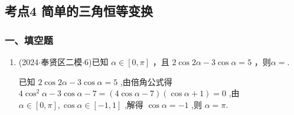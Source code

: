 \subsection*{考点4 简单的三角恒等变换}

\subsubsection*{一、填空题}
\begin{enumerate}
    \item (2024$\cdot$奉贤区二模$\cdot$6)已知 $\alpha  \in  \left\lbrack  {0,\pi }\right\rbrack$ ，且 ${2\cos {2\alpha } - 3\cos \alpha } = 5$ ，则$\alpha = $\blkda[2]{$\pi$}.
    \begin{jieda}
        已知 $2\cos {2\alpha } - 3\cos \alpha  = 5$ ,由倍角公式得 $4{\cos }^{2}\alpha  -  3\cos \alpha  - 7 = \left( {4\cos \alpha  - 7}\right) \left( {\cos \alpha  + 1}\right)  = 0$ ,由 $\alpha  \in  \left\lbrack  {0,\pi }\right\rbrack  ,\cos \alpha  \in  \left\lbrack  {-1,1}\right\rbrack$ ,解得 $\cos \alpha  =  - 1$ ,则 $\alpha  = \pi$.
    \end{jieda}
\end{enumerate}

